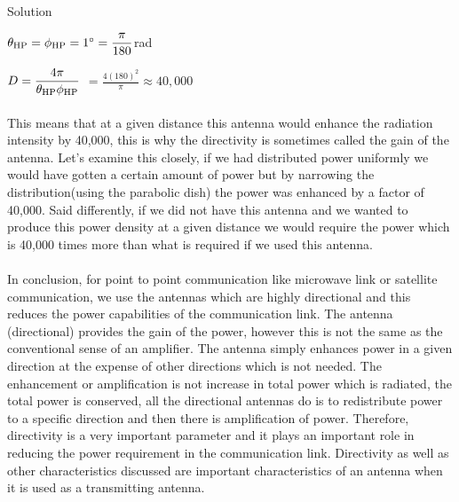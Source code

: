 \begin{center}
	Solution
	
	
	$\theta_\textnormal{HP} =\phi_\textnormal{HP} =1^{\circ
	}=\dfrac{\pi}{180}$rad
	
	
	$D=\dfrac{4\pi}{\theta_\textnormal{HP}\phi_\textnormal{HP}}$
	$= \frac{4(180)^2}{\pi} \approx 40,000$
\end{center}
\paragraph{}
This means that at a given distance this antenna would enhance the radiation intensity by 40,000, this is why the directivity is sometimes called the gain of the antenna. Let's examine this closely, if we had distributed power uniformly we would have gotten a certain amount of power but by narrowing the distribution(using the parabolic dish) the power was enhanced by a factor of 40,000. Said differently, if we did not have this antenna and we wanted to produce this power density at a given distance we would require the power which is 40,000 times more than what is required if we used this antenna.
\paragraph{}
In conclusion, for point to point communication like microwave link or satellite communication, we use the antennas which are highly directional and this reduces the power capabilities of the communication link. The antenna (directional) provides the gain of the power, however this is not the same as the conventional sense of an amplifier. The antenna simply enhances power in a given direction at the expense of other directions which is not needed. The enhancement or amplification is not increase in total power which is radiated, the total power is conserved, all the directional antennas do is to redistribute power to a specific direction and then there is amplification of power. Therefore, directivity is a very important parameter and it plays an important role in reducing the power requirement in the communication link. Directivity as well as other characteristics discussed are important characteristics of an antenna when it is used as a transmitting antenna.